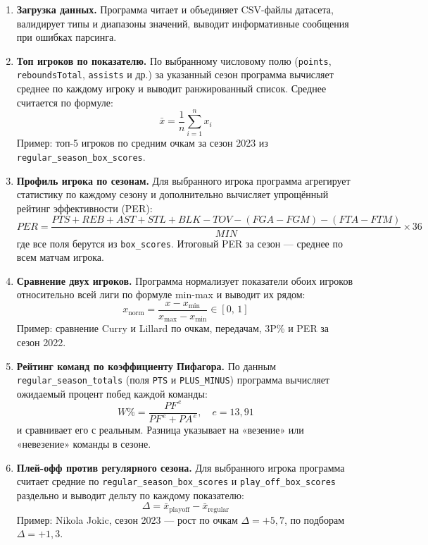 \documentclass[a4paper, final]{article}
\begin{document}
\begin{enumerate}

    \item \textbf{Загрузка данных.} Программа читает и объединяет CSV-файлы датасета, валидирует типы и диапазоны значений, выводит информативные сообщения при ошибках парсинга.

    \item \textbf{Топ игроков по показателю.} По выбранному числовому полю (\texttt{points}, \texttt{reboundsTotal}, \texttt{assists} и др.) за указанный сезон программа вычисляет среднее по каждому игроку и выводит ранжированный список. Среднее считается по формуле:
    \[
        \bar{x} = \frac{1}{n}\sum_{i=1}^{n} x_i
    \]
    Пример: топ-5 игроков по средним очкам за сезон 2023 из \texttt{regular\_season\_box\_scores}.

    \item \textbf{Профиль игрока по сезонам.} Для выбранного игрока программа агрегирует статистику по каждому сезону и дополнительно вычисляет упрощённый рейтинг эффективности (PER):
    \[
        PER = \frac{PTS + REB + AST + STL + BLK - TOV - (FGA - FGM) - (FTA - FTM)}{MIN} \times 36
    \]
    где все поля берутся из \texttt{box\_scores}. Итоговый PER за сезон — среднее по всем матчам игрока.

    \item \textbf{Сравнение двух игроков.} Программа нормализует показатели обоих игроков относительно всей лиги по формуле min-max и выводит их рядом:
    \[
        x_{\text{norm}} = \frac{x - x_{\min}}{x_{\max} - x_{\min}} \in [0,\,1]
    \]
    Пример: сравнение Curry и Lillard по очкам, передачам, 3P\% и PER за сезон 2022.

    \item \textbf{Рейтинг команд по коэффициенту Пифагора.} По данным \texttt{regular\_season\_totals} (поля \texttt{PTS} и \texttt{PLUS\_MINUS}) программа вычисляет ожидаемый процент побед каждой команды:
    \[
        W\% = \frac{PF^{\,e}}{PF^{\,e} + PA^{\,e}}, \quad e = 13{,}91
    \]
    и сравнивает его с реальным. Разница указывает на «везение» или «невезение» команды в сезоне.

    \item \textbf{Плей-офф против регулярного сезона.} Для выбранного игрока программа считает средние по \texttt{regular\_season\_box\_scores} и \texttt{play\_off\_box\_scores} раздельно и выводит дельту по каждому показателю:
    \[
        \Delta = \bar{x}_{\text{playoff}} - \bar{x}_{\text{regular}}
    \]
    Пример: Nikola Jokic, сезон 2023 — рост по очкам $\Delta = +5{,}7$, по подборам $\Delta = +1{,}3$.


\end{enumerate}
\end{document}
